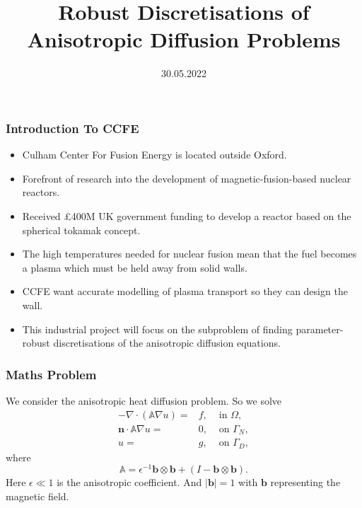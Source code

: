 \documentclass{beamer}
\title{Robust Discretisations of Anisotropic Diffusion Problems} %
\author%
{%
    \sc{Mark Pearson, Patrick E. Farrell}
}
\institute%
{%
    \textit{Mathematical Institute}\\
    \textit{University of Oxford}
}
\date[Trinity Term 2022]{30.05.2022} %
\begin{document}
    \begin{frame}[plain]
        \titlepage
    \end{frame}
    
    \begin{frame}
        \frametitle{Introduction To CCFE}
        \begin{itemize}
\item Culham Center For Fusion Energy is located outside Oxford.
\item Forefront of 
research into the development of magnetic-fusion-based nuclear reactors.
\item Received £400M UK government funding to 
develop a reactor based on the spherical tokamak concept.
\item The high 
temperatures needed for nuclear fusion mean that the fuel becomes a plasma which must be 
held away from solid walls.
\item CCFE want accurate modelling of plasma transport so they can design the wall.
\item This industrial project will focus on the subproblem of finding parameter-robust discretisations of the anisotropic diffusion equations.
        \end{itemize}
    \end{frame}
    
    \begin{frame}
        \frametitle{Maths Problem}

            We consider the anisotropic heat diffusion problem. So we solve
            \begin{align*}
                -\nabla \cdot (\mathbb{A}\nabla u) =& f, &  \text{ in }\Omega,\\
                \mathbf{n}\cdot \mathbb{A}\nabla u =& 0, & \text{ on }\Gamma_N, \\
                u =& g, & \text{  on }\Gamma_D,
            \end{align*}
     where 
     \begin{equation*}
     \mathbb{A} = \epsilon^{-1} \mathbf{b}\otimes \mathbf{b}+(I - \mathbf{b}\otimes \mathbf{b}).
     \end{equation*}
    Here $\epsilon \ll 1$ is the anisotropic coefficient. And $|\mathbf{b}|=1$ with $\mathbf{b}$ representing the magnetic field.
    \end{frame}
    
\end{document}
